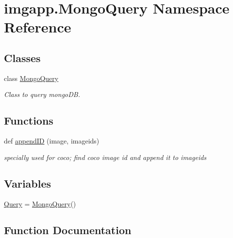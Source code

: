 \hypertarget{namespaceimgapp_1_1MongoQuery}{}\section{imgapp.\+Mongo\+Query Namespace Reference}
\label{namespaceimgapp_1_1MongoQuery}
\subsection*{Classes}
\begin{DoxyCompactItemize}
\item 
class \hyperlink{classimgapp_1_1MongoQuery_1_1MongoQuery}{Mongo\+Query}
\begin{DoxyCompactList}\small\item\em Class to query mongo\+DB. \end{DoxyCompactList}\end{DoxyCompactItemize}
\subsection*{Functions}
\begin{DoxyCompactItemize}
\item 
def \hyperlink{namespaceimgapp_1_1MongoQuery_aa2f709bf0b0e267cfb513e326bbc6e4d}{append\+ID} (image, imageids)
\begin{DoxyCompactList}\small\item\em specially used for coco; find coco image id and append it to imageids \end{DoxyCompactList}\end{DoxyCompactItemize}
\subsection*{Variables}
\begin{DoxyCompactItemize}
\item 
\hyperlink{namespaceimgapp_1_1MongoQuery_a3c845d9e355454c43db2eca20b9058bb}{Query} = \hyperlink{classimgapp_1_1MongoQuery_1_1MongoQuery}{Mongo\+Query}()
\end{DoxyCompactItemize}


\subsection{Function Documentation}
\mbox{\label{namespaceimgapp_1_1MongoQuery_aa2f709bf0b0e267cfb513e326bbc6e4d}} 
